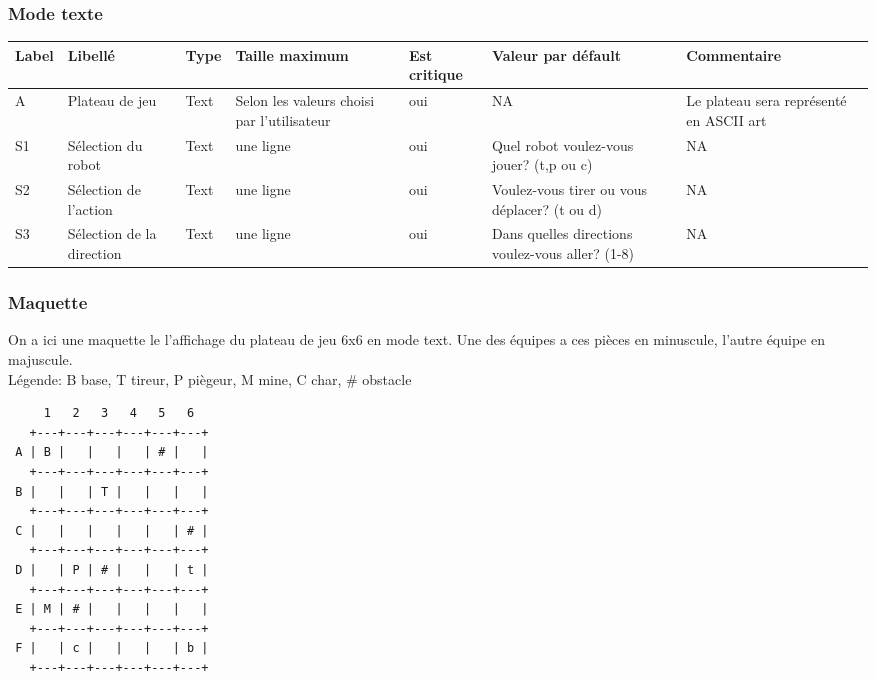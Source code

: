 \documentclass[12pt,a4paper]{article}
\begin{document}
\begin{itemize}
			\subsubsection{Mode texte}
				\hspace{-3cm}
				\begin{tabular}{|p{1cm}|p{2.5cm}|p{1.5cm}|p{2.5cm}|p{2.5cm}|p{3cm}|p{3cm}|} %
					\hline
						Label & Libellé & Type & Taille maximum & Est critique & Valeur par défault & Commentaire \\
					\hline \hline
						A & Plateau de jeu & Text & Selon les valeurs choisi par l'utilisateur & oui & NA & Le plateau sera représenté en ASCII art \\
						\hline
						S1 & Sélection du robot & Text & une ligne & oui & Quel robot voulez-vous jouer? (t,p ou c) & NA \\
						\hline
						S2 &Sélection de l'action & Text & une ligne & oui & Voulez-vous tirer ou vous déplacer? (t ou d) &  NA \\
						\hline
						S3 & Sélection de la direction & Text & une ligne & oui & Dans quelles directions voulez-vous aller? (1-8) & NA\\
					\hline
				\end{tabular}
				\label{Informations présentes sur l'écran de jeu texte}
					\newpage
					\subsubsection*{Maquette}
					On a ici une maquette le l'affichage du plateau de jeu 6x6 en mode text. Une des équipes a ces pièces en minuscule, l'autre équipe en majuscule. \\
					Légende: B base, T tireur, P piègeur, M mine, C char, \# obstacle
		\begin{lstlisting}
     1   2   3   4   5   6
   +---+---+---+---+---+---+
 A | B |   |   |   | # |   |
   +---+---+---+---+---+---+
 B |   |   | T |   |   |   |
   +---+---+---+---+---+---+
 C |   |   |   |   |   | # |
   +---+---+---+---+---+---+
 D |   | P | # |   |   | t |
   +---+---+---+---+---+---+
 E | M | # |   |   |   |   |
   +---+---+---+---+---+---+
 F |   | c |   |   |   | b |
   +---+---+---+---+---+---+
		\end{lstlisting}


\end{itemize}
\end{document}
